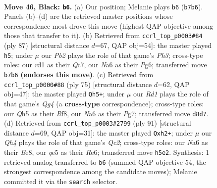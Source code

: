 \documentclass[11pt]{article}
\begin{document}
\clearpage

\begin{figure}[p]\centering
\begin{subfigure}{0.46\textwidth}\centering
\resizebox{\linewidth}{!}{%
\newchessgame
\chessboard[
  setfen={3r2k1/pp6/n2P4/4Qp1q/P1p5/6P1/1P6/R2R1K2 b - - 0 46},
  showmover=false,
  pgfstyle=straightmove, color=movearrow, markmove={b7-b6}
]}
\caption{}
\end{subfigure}\hfill
\begin{subfigure}{0.46\textwidth}\centering
\resizebox{\linewidth}{!}{%
\newchessgame
\chessboard[
  setfen={6k1/2q2p2/6pp/3Q4/1p5P/1P3RP1/4rP1K/8 b - - 0 44},
  showmover=false,
  pgfstyle=straightmove, color=movearrow, markmove={h6-h5}
]}
\caption{}
\end{subfigure}
\\[4pt]
\begin{subfigure}{0.46\textwidth}\centering
\resizebox{\linewidth}{!}{%
\newchessgame
\chessboard[
  setfen={5r2/1p4pk/p7/P2QP1q1/8/1PP2R1K/7P/8 b - - 0 38},
  showmover=false,
  pgfstyle=straightmove, color=movearrow, markmove={g5-h5}
]}
\caption{}
\end{subfigure}\hfill
\begin{subfigure}{0.46\textwidth}\centering
\resizebox{\linewidth}{!}{%
\newchessgame
\chessboard[
  setfen={4b1k1/p1q5/4rPp1/2p5/2P4Q/2P5/1r4PR/5RK1 b - - 4 46},
  showmover=false,
  pgfstyle=straightmove, color=movearrow, markmove={c7-h2}
]}
\caption{}
\end{subfigure}
\caption{\textbf{Move 46, Black: \texttt{b6}.} (a) Our position; Melanie plays \texttt{b6} (\texttt{b7b6}). Panels (b)--(d) are the retrieved master positions whose correspondence most drove this move (highest QAP objective among those that transfer to it). (b) Retrieved from \texttt{ccrl\_top\_p0003\#84} (ply 87) [structural distance $d$=67, QAP obj=54]: the master played \texttt{h5}; under $\mu$ our \emph{Pb2} plays the role of that game's \emph{Ph3}; cross-type roles: our \emph{r}d1 as their \emph{Q}c7, our \emph{N}a6 as their \emph{P}g6; transferred move \texttt{b7b6} \textbf{(endorses this move)}. (c) Retrieved from \texttt{ccrl\_top\_p0000\#88} (ply 75) [structural distance $d$=62, QAP obj=47]: the master played \texttt{Qh5+}; under $\mu$ our \emph{Rd1} plays the role of that game's \emph{Qg4} (a \textbf{cross-type} correspondence); cross-type roles: our \emph{Q}h5 as their \emph{R}f8, our \emph{N}a6 as their \emph{P}g7; transferred move \texttt{d8d7}. (d) Retrieved from \texttt{ccrl\_top\_p0003\#2799} (ply 91) [structural distance $d$=69, QAP obj=31]: the master played \texttt{Qxh2+}; under $\mu$ our \emph{Qh4} plays the role of that game's \emph{Qc2}; cross-type roles: our \emph{N}a6 as their \emph{B}e8, our \emph{q}e5 as their \emph{R}e6; transferred move \texttt{h5e2}. Synthesis: 1 retrieved analog transferred to \texttt{b6} (summed QAP objective 54, the strongest correspondence among the candidate moves); Melanie committed it via the \texttt{search} selector.}
\label{fig:thought-m91}
\end{figure}
\end{document}
